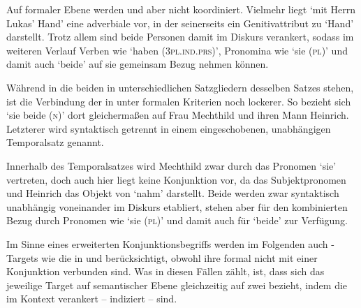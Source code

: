 Auf formaler Ebene werden  und  aber nicht
koordiniert. Vielmehr liegt  `mit
Herrn Lukas' Hand' eine adverbiale  vor,
in der  seinerseits ein Genitivattribut zu 
`Hand' darstellt. Trotz allem sind beide Personen damit im Diskurs
verankert, sodass im weiteren Verlauf Verben wie 
`haben (\textsc{3pl.ind.prs})', Pronomina wie  `sie (\textsc{pl})'
und damit auch  `beide' auf sie gemeinsam Bezug nehmen können.

Während in  die beiden  in
unterschiedlichen Satzgliedern desselben Satzes stehen, ist die Verbindung der
 in  unter formalen Kriterien noch
lockerer. So bezieht sich  `sie beide (\textsc{n})' dort
gleichermaßen auf Frau Mechthild und ihren Mann Heinrich. Letzterer wird
syntaktisch getrennt in einem eingeschobenen, unabhängigen Temporalsatz
genannt.


Innerhalb des Temporalsatzes wird Mechthild zwar durch das Pronomen 
`sie' vertreten, doch auch hier liegt keine Konjunktion vor, da  das
Subjektpronomen und Heinrich das Objekt von  `nahm' darstellt. Beide
 werden zwar syntaktisch unabhängig voneinander im Diskurs
etabliert, stehen aber für den kombinierten Bezug durch Pronomen wie
 `sie (\textsc{pl})' und damit auch für 
`beide' zur Verfügung.

Im Sinne eines erweiterten Konjunktionsbegriffs werden im Folgenden auch
-Targets wie die in  und
 berücksichtigt, obwohl ihre  formal
nicht mit einer Konjunktion verbunden sind. Was in diesen Fällen zählt, ist,
dass sich das jeweilige Target auf semantischer Ebene gleichzeitig auf zwei
 bezieht, indem die  im Kontext
verankert -- indiziert -- sind.


